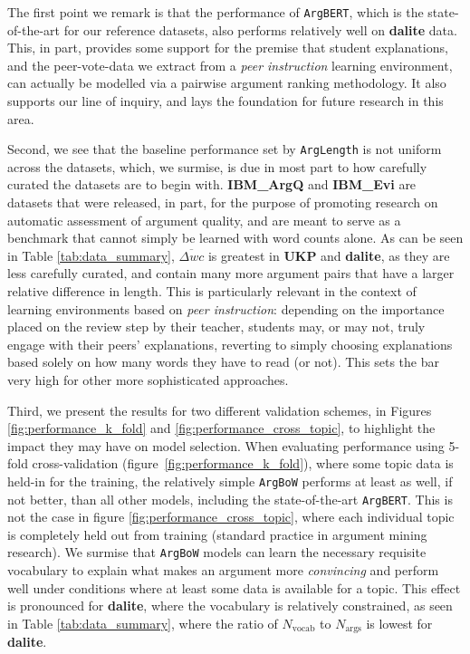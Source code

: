 \documentclass[runningheads]{llncs}
\begin{document}
The first point we remark is that the performance of \verb|ArgBERT|, which is 
the state-of-the-art for our reference datasets, also performs relatively well 
on \textbf{dalite} data.
This, in part, provides some support for the premise that student explanations, 
and the peer-vote-data we extract from a \textit{peer instruction} learning 
environment, can actually be modelled via a pairwise argument ranking 
methodology.
It also supports our line of inquiry, and lays the foundation 
for future research in this area.

Second, we see that the baseline performance set by \verb|ArgLength| is 
not uniform across the datasets, which, we surmise, is due in most part to how 
carefully curated the datasets are to begin with.
\textbf{IBM\_ArgQ} and \textbf{IBM\_Evi} are datasets that were released, in 
part, for the purpose of promoting research on automatic assessment of argument 
quality, and are meant to serve as a benchmark that cannot simply be learned 
with word counts alone.   
As can be seen in Table \ref{tab:data_summary}, $\overline{\Delta wc}$ is 
greatest in \textbf{UKP} and \textbf{dalite}, as they are less carefully 
curated, and contain many more argument pairs that have a larger relative 
difference in length. 
This is particularly relevant in the context of learning environments based 
on \textit{peer instruction}: depending on the importance placed on the 
review step by their teacher, students may, or may not, truly engage with their 
peers' explanations, reverting to simply choosing explanations based solely on 
how many words they have to read (or not). 
This sets the bar very high for other more sophisticated approaches.

Third, we present the results for two different validation schemes, in Figures 
\ref{fig:performance_k_fold} and \ref{fig:performance_cross_topic}, to 
highlight the impact they may have on model selection.
When evaluating performance using 5-fold cross-validation 
(figure~\ref{fig:performance_k_fold}), where some topic data is held-in for the 
training, the relatively simple \verb|ArgBoW| performs at least as well, if not 
better, than all other models, including the state-of-the-art \verb|ArgBERT|.
This is not the case in figure \ref{fig:performance_cross_topic}, where 
each individual topic is completely held out from training (standard practice 
in argument mining research).
We surmise that \verb|ArgBoW| models can learn the necessary requisite 
vocabulary to explain what makes an argument more \textit{convincing} and 
perform well under conditions where at least some data is available for a 
topic. 
This effect is pronounced for \textbf{dalite}, where the vocabulary is 
relatively constrained, as seen in Table \ref{tab:data_summary}, where the 
ratio of $N_{\mathrm{vocab}}$ to $N_{\mathrm{args}}$ is lowest for 
\textbf{dalite}. 
\end{document}
